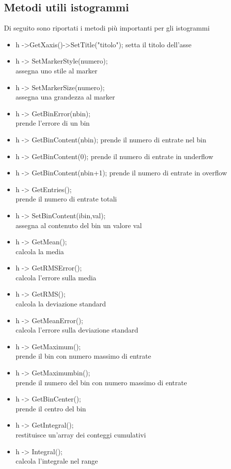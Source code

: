 \documentclass[10pt,a4paper]{article}
\begin{document}
\subsection{Metodi utili istogrammi}
Di seguito sono riportati i metodi più importanti per gli istogrammi
\begin{itemize}
	\item h ->GetXaxis()->SetTitle("titolo");
	setta il titolo dell'asse
	\item h -> SetMarkerStyle(numero);\\
	assegna uno stile al marker
	\item h -> SetMarkerSize(numero);\\
	assegna una grandezza al marker
	\item h -> GetBinError(nbin);\\
	prende l'errore di un bin
	\item h -> GetBinContent(nbin);
	prende il numero di entrate nel bin
	\item h -> GetBinContent(0);
	prende il numero di entrate in underflow
	\item h -> GetBinContent(nbin+1);
	prende il numero di entrate in overflow
	\item h -> GetEntries();\\
	prende il numero di entrate totali
	\item h -> SetBinContent(ibin,val);\\
	assegna al contenuto del bin un valore val
	\item h -> GetMean();\\
	calcola la media
	\item h -> GetRMSError();\\
	calcola l'errore sulla media
	\item h -> GetRMS();\\
	calcola la deviazione standard
	\item h -> GetMeanError();\\
	calcola l'errore sulla deviazione standard
	\item h -> GetMaximum();\\
	prende il bin con numero massimo di entrate
	\item h -> GetMaximumbin();\\
	prende il numero del bin con numero massimo di entrate
	\item h -> GetBinCenter();\\
	prende il centro del bin
	\item h -> GetIntegral();\\
	restituisce un'array dei conteggi cumulativi 
	\item h -> Integral();\\
	calcola l'integrale nel range
\end{itemize}
\end{document}

